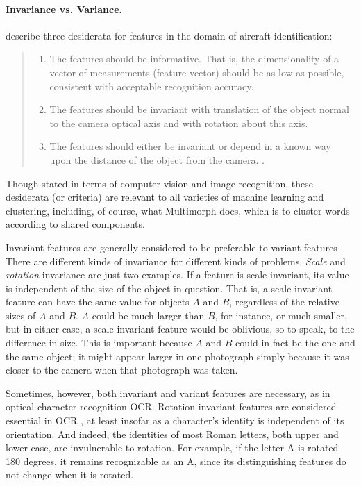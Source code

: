 \paragraph{Invariance vs. Variance.}
\cite{dudani-et-al:1977} describe three desiderata for features in the 
domain of aircraft identification:
\begin{quote}
\begin{enumerate}
\item The features should be informative. That is, the dimensionality of a 
vector of measurements (feature vector) should be as low as possible, 
consistent with acceptable recognition accuracy.
\item The features should be invariant with translation of the object 
normal to the camera optical axis and with rotation about this axis.
\item The features should either be invariant or depend in a known 
way upon the distance of the object from the camera.
\citep[][p. 40]{dudani-et-al:1977}.
\end{enumerate}
\end{quote}
Though stated in terms of computer vision and image recognition, 
these desiderata (or criteria) are relevant to all varieties of machine 
learning and clustering, including, of course, what Multimorph does, which is to
cluster words according to shared components.  

Invariant features are generally considered to be preferable to variant 
features \citep{hossain-et-al:2012}. 
There are different kinds of invariance for different kinds of problems.
\emph{Scale} and \emph{rotation} invariance are just two examples. If a feature 
is scale-invariant, its
value is independent of the size of the object in question. That is, a 
scale-invariant feature
can have the same value for objects $A$ and $B$, regardless of the 
relative sizes of $A$ and $B$. $A$ could be much larger than $B$, for instance, or much smaller,
but in either case, a scale-invariant feature would be oblivious, so to speak, to the difference in size. 
This is important because $A$ and $B$ could in fact be the one and the same object; it might appear 
larger in one photograph simply because 
it was closer to the camera when that photograph was taken.

Sometimes, however, both invariant and variant features are necessary, 
as in optical character recognition \ac{OCR}\citep{trier-et-al:1996}.
Rotation-invariant features are considered essential in \ac{OCR} \citep{trier-et-al:1996}, 
at least
insofar as a character's identity is independent 
of its orientation.
And indeed, the identities of most Roman letters, both upper and lower case, are invulnerable to rotation.
For example, if the letter \textsf{A} is rotated 180 degrees, it remains 
recognizable as an \textsf{A}, since its distinguishing features do not change when it is rotated. 

